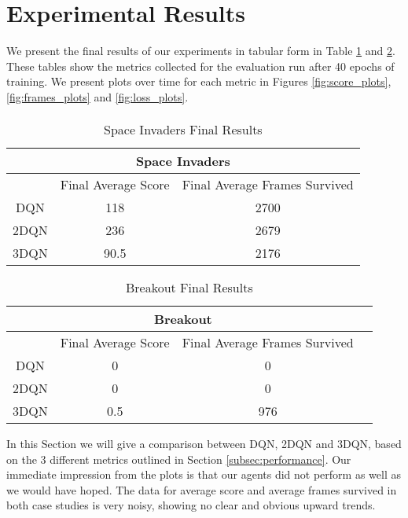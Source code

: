 \section{Experimental Results} \label{sec:results}
We present the final results of our experiments in tabular form in Table \ref{table:siscores} and
\ref{table:brscores}. These tables show the metrics collected for the evaluation run after 40 epochs of training. We present plots over time for each metric in Figures \ref{fig:score_plots}, \ref{fig:frames_plots} and \ref{fig:loss_plots}. \paragraph{}
\begin{table}[h]
	\centering
	\begin{tabular}{| c || c | c |}
		\hline
		\multicolumn{3}{|c|}{Space Invaders}                       \\
		\hline
		     & Final Average Score & Final Average Frames Survived \\
		\hline
		DQN  & 118                 & 2700                          \\
		\hline
		2DQN & 236                 & 2679                          \\
		\hline
		3DQN & 90.5                & 2176                          \\
		\hline
	\end{tabular}
	\caption{Space Invaders Final Results}
	\label{table:siscores}
\end{table}

\begin{table}[h]
	\centering
	\begin{tabular}{| c || c | c | c |}
		\hline
		\multicolumn{3}{|c|}{Breakout}                             \\
		\hline
		     & Final Average Score & Final Average Frames Survived \\
		\hline
		DQN  & 0                   & 0                             \\
		\hline
		2DQN & 0                   & 0                             \\
		\hline
		3DQN & 0.5                 & 976                           \\
		\hline
	\end{tabular}
	\caption{Breakout Final Results}
	\label{table:brscores}
\end{table}

In this Section we will give a comparison between DQN, 2DQN and 3DQN, based on the 3 different metrics outlined in Section \ref{subsec:performance}. Our immediate impression from the plots is that our agents did not perform as well as we would have hoped. The data for average score and average frames survived in both case studies is very noisy, showing no clear and obvious upward trends. 

